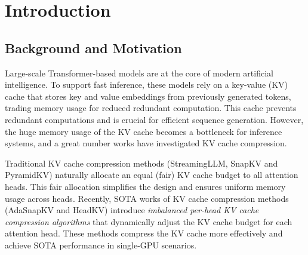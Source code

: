 \section{Introduction}

\subsection{Background and Motivation}

Large-scale Transformer-based models are at the core of modern artificial intelligence. To support fast inference, these models rely on a key-value (KV) cache\cite{Vaswani2017AttentionIA,Dai2019TransformerXLAL,Rae2019CompressiveTF} that stores key and value embeddings from previously generated tokens, trading memory usage for reduced redundant computation. This cache prevents redundant computations and is crucial for efficient sequence generation. 
%
%
However, the huge memory usage of the KV cache becomes a bottleneck for inference systems, and a great number works have investigated KV cache compression\cite{ge2024modeltellsdiscardadaptive,Liu2023CacheGenKC,xiao2024efficientstreaminglanguagemodels,li2024snapkvllmknowslooking,cai2024pyramidkvdynamickvcache,feng2024adakv,fu2024headsmatterheadlevelkv,Adnan2024KeyformerKC}.




%
Traditional KV cache compression methods (StreamingLLM\cite{xiao2024efficientstreaminglanguagemodels}, SnapKV\cite{li2024snapkvllmknowslooking} and PyramidKV\cite{cai2024pyramidkvdynamickvcache}) naturally allocate an equal (fair) KV cache budget to all attention heads.
%
This fair allocation simplifies the design and ensures uniform memory usage across heads. 
%
%
Recently, SOTA works of KV cache compression methods (AdaSnapKV\cite{feng2024adakv} and HeadKV\cite{fu2024headsmatterheadlevelkv}) introduce \textit{imbalanced per-head KV cache compression algorithms} that dynamically adjust the KV cache budget for each attention head.
%
These methods compress the KV cache more effectively and achieve SOTA performance in single-GPU scenarios.


